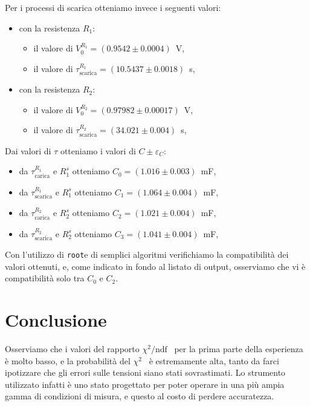 \documentclass[italian, a4paper, 10pt, twocolumn]{../../style/lab_unige}
\newcommand{\ChiSqr}{$\chi^2$\space}
\newcommand{\ChiNdf}{$\chi^2/\text{ndf}$}
\newcommand{\cernroot}{\texttt{root}}
\newcommand{\mstdErr}[1]{\varepsilon_{#1}}
\begin{document}
    Per i processi di scarica otteniamo invece i seguenti valori:
    \begin{itemize}
        \item con la resistenza $R_1$:
        \begin{itemize}
            \item il valore di $V_0^{R_1}=(0.9542\pm0.0004)$~V, 
            \item il valore di $\tau^{R_1}_{\text{scarica}}=(10.5437\pm0.0018)$~s, 
        \end{itemize}
        \item con la resistenza $R_2$:
        \begin{itemize}
            \item il valore di $V_0^{R_2}=(0.97982\pm0.00017)$~V,
            \item il valore di $\tau^{R_2}_{\text{scarica}}=(34.021\pm0.004)$~s,
        \end{itemize}
    \end{itemize}

    Dai valori di $\tau$ otteniamo i valori di $C\pm\mstdErr{C}$:
    \begin{itemize}
        \item da $\tau^{R_1}_{\text{carica}}$ e $R_1^s$ otteniamo $C_0=(1.016\pm0.003)$~mF,
        \item da $\tau^{R_1}_{\text{scarica}}$ e $R_1^s$ otteniamo $C_1=(1.064\pm0.004)$~mF,
        \item da $\tau^{R_2}_{\text{carica}}$ e $R_2^s$ otteniamo $C_2=(1.021\pm0.004)$~mF,
        \item da $\tau^{R_2}_{\text{scarica}}$ e $R_2^s$ otteniamo $C_3=(1.041\pm0.004)$~mF,
    \end{itemize}

    Con l'utilizzo di \cernroot e di semplici algoritmi verifichiamo la compatibilità dei valori ottenuti, e, come indicato in fondo al listato di output, osserviamo che vi è compatibilità solo tra $C_0$ e $C_2$.

    \section{Conclusione}
    \label{section:conclusion}

    Osserviamo che i valori del rapporto \ChiNdf~ per la prima parte della esperienza è molto basso, e la probabilità del \ChiSqr~ è estremamente alta, tanto da farci ipotizzare che gli errori sulle tensioni siano stati sovrastimati. Lo strumento utilizzato infatti è uno stato progettato per poter operare in una più ampia gamma di condizioni di misura, e questo al costo di perdere accuratezza.
\end{document}
